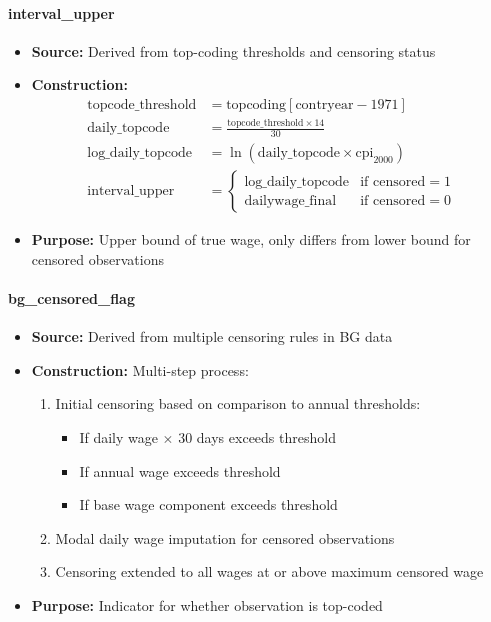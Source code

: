 \documentclass{article}
\begin{document}
\paragraph{interval\_upper}
\begin{itemize}
    \item \textbf{Source:} Derived from top-coding thresholds and censoring status
    \item \textbf{Construction: }
    \begin{align}
        \text{topcode\_threshold} &= \text{topcoding}[\text{contryear} - 1971]\\
        \text{daily\_topcode} &= \frac{\text{topcode\_threshold} \times 14}{30}\\
        \text{log\_daily\_topcode} &= \ln(\text{daily\_topcode} \times \text{cpi}_{2000})\\
        \text{interval\_upper} &= \begin{cases}
            \text{log\_daily\_topcode} & \text{if censored} = 1\\
            \text{dailywage\_final} & \text{if censored} = 0
        \end{cases}
    \end{align}
    \item \textbf{Purpose:} Upper bound of true wage, only differs from lower bound for censored observations
\end{itemize}

\paragraph{bg\_censored\_flag}
\begin{itemize}
    \item \textbf{Source:} Derived from multiple censoring rules in BG data
    \item \textbf{Construction:} Multi-step process:
    \begin{enumerate}
        \item Initial censoring based on comparison to annual thresholds:
        \begin{itemize}
            \item If daily wage $\times$ 30 days exceeds threshold
            \item If annual wage exceeds threshold
            \item If base wage component exceeds threshold
        \end{itemize}
        \item Modal daily wage imputation for censored observations
        \item Censoring extended to all wages at or above maximum censored wage
    \end{enumerate}
    \item \textbf{Purpose:} Indicator for whether observation is top-coded
\end{itemize}
\end{document}
